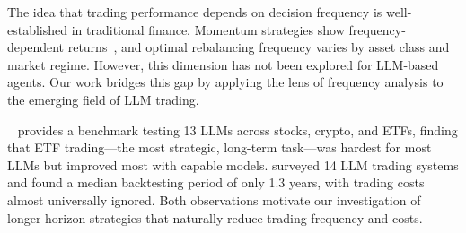 The idea that trading performance depends on decision frequency is well-established in traditional finance. Momentum strategies show frequency-dependent returns~\citep{jegadeesh1993returns}, and optimal rebalancing frequency varies by asset class and market regime. However, this dimension has not been explored for LLM-based agents. Our work bridges this gap by applying the lens of frequency analysis to the emerging field of LLM trading.

\investorbench~\citep{li2024investorbench} provides a benchmark testing 13 LLMs across stocks, crypto, and ETFs, finding that ETF trading---the most strategic, long-term task---was hardest for most LLMs but improved most with capable models. \citet{ding2024survey} surveyed 14 LLM trading systems and found a median backtesting period of only 1.3 years, with trading costs almost universally ignored. Both observations motivate our investigation of longer-horizon strategies that naturally reduce trading frequency and costs.
